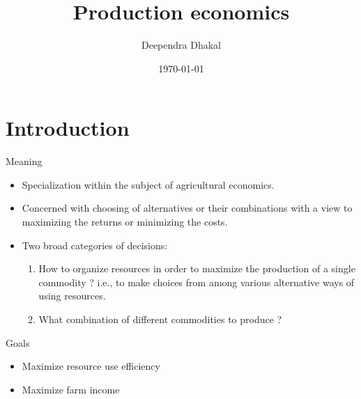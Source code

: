 \documentclass[12pt,ignorenonframetext,aspectratio=169]{beamer}
\title{\insertsectionhead}
  {
    \definecolor{white}{rgb}{0.776,0.357,0.157}
    \definecolor{iqss@orange}{rgb}{1,1,1}
    \ifnum \insertmainframenumber > \insertframenumber
    \frame{
      \frametitle{\iqsssectiontitleheader}
      \tableofcontents[currentsection]
    }
    \else
    \frame{
      \frametitle{Backup Slides}
      \tableofcontents[sectionstyle=shaded/shaded,subsectionstyle=shaded/shaded/shaded]
    }
    \fi
  }
\title[]{Production economics}
\author[
        Deependra Dhakal
    ]{Deependra Dhakal}
\institute[
    ]{
    GAASC, Baitadi \and Tribhuwan University
    }
\date[
      \today
  ]{
      \today
        }
\providecommand{\tightlist}{%
  \setlength{\itemsep}{0pt}\setlength{\parskip}{0pt}}
\begin{document}
  \begin{frame}[plain]
  \titlepage
  \end{frame}



\hypertarget{introduction}{%
\section{Introduction}\label{introduction}}

\begin{frame}{Meaning}
\protect\hypertarget{meaning}{}
\begin{itemize}
\tightlist
\item
  Specialization within the subject of agricultural economics.
\item
  Concerned with choosing of alternatives or their combinations with a
  view to maximizing the returns or minimizing the costs.
\item
  Two broad categories of decisions:

  \begin{enumerate}
  \tightlist
  \item
    How to organize resources in order to maximize the production of a
    single commodity ? i.e., to make choices from among various
    alternative ways of using resources.
  \item
    What combination of different commodities to produce ?
  \end{enumerate}
\end{itemize}

\begin{block}{Goals}
\protect\hypertarget{goals}{}
\begin{itemize}
\tightlist
\item
  Maximize resource use efficiency
\item
  Maximize farm income
\end{itemize}
\end{block}
\end{frame}
\end{document}
